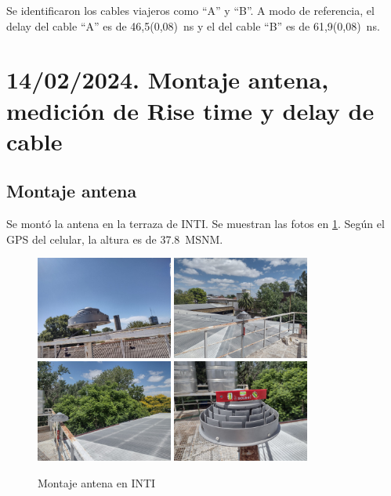 \documentclass[11pt]{article}
\begin{document}
Se identificaron los cables viajeros como ``A'' y ``B''. A modo de referencia, el delay del cable ``A'' es de \SI{46,5(0,08)}{\nano\second} y el del cable ``B'' es de \SI{61,9(0,08)}{\nano\second}.


\section{14/02/2024. Montaje antena, medición de Rise time y delay de cable}

\subsection{Montaje antena}

Se montó la antena en la terraza de INTI. Se muestran las fotos en \ref{fig:antenaINTI}. Según el GPS del celular, la altura es de \SI{37.8} MSNM.


\begin{figure}[ht]
    \begin{center}
        \includegraphics[width=0.4\textwidth]{./figuras/AntenaSIM1}
            \includegraphics[width=0.4\textwidth]{./figuras/AntenaSIM2}
            \includegraphics[width=0.4\textwidth]{./figuras/AntenaSIM3}
            \includegraphics[width=0.4\textwidth]{./figuras/AntenaSIM4}
        \caption{Montaje antena en INTI}
        \label{fig:antenaINTI}
    \end{center}
\end{figure}
\end{document}
